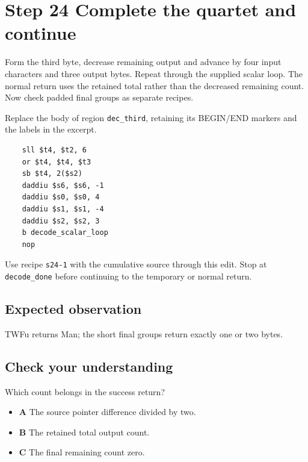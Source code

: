 \section{Step 24 Complete the quartet and continue}\label{base64-s24}

Form the third byte, decrease remaining output and advance by four input characters and three output bytes. Repeat through the supplied scalar loop. The normal return uses the retained total rather than the decreased remaining count. Now check padded final groups as separate recipes.

Replace the body of region \texttt{dec\_third}, retaining its BEGIN/END markers and the labels in the excerpt.

\begin{verbatim}
    sll $t4, $t2, 6
    or $t4, $t4, $t3
    sb $t4, 2($s2)
    daddiu $s6, $s6, -1
    daddiu $s0, $s0, 4
    daddiu $s1, $s1, -4
    daddiu $s2, $s2, 3
    b decode_scalar_loop
    nop
\end{verbatim}

Use recipe \texttt{s24-1} with the cumulative source through this edit. Stop at \texttt{decode\_done} before continuing to the temporary or normal return.

\subsection{Expected observation}
TWFu returns Man; the short final groups return exactly one or two bytes.

\subsection{Check your understanding}
Which count belongs in the success return?

\begin{itemize}
  \item \textbf{A} The source pointer difference divided by two.
  \item \textbf{B} The retained total output count.
  \item \textbf{C} The final remaining count zero.
\end{itemize}
